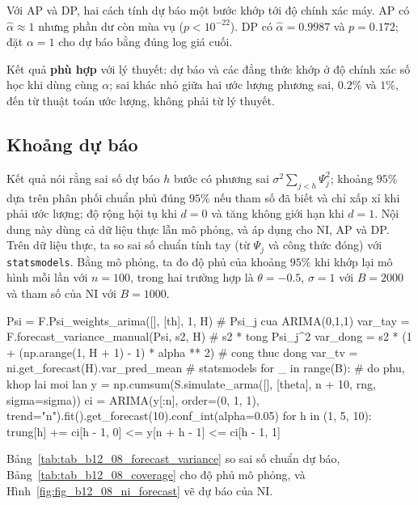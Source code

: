 Với AP và DP, hai cách tính dự báo một bước khớp tới độ chính xác máy. AP có $\hat\alpha\approx1$ nhưng phần dư còn mùa vụ ($p<10^{-22}$). DP có $\hat\alpha=0.9987$ và $p=0.172$; đặt $\alpha=1$ cho dự báo bằng đúng log giá cuối.

 Kết quả \textbf{phù hợp} với lý thuyết: dự báo và các đẳng thức khớp ở độ chính xác số học khi dùng cùng $\alpha$; sai khác nhỏ giữa hai ước lượng phương sai, $0.2\%$ và $1\%$, đến từ thuật toán ước lượng, không phải từ lý thuyết.

\subsection{Khoảng dự báo}

 Kết quả  nói rằng sai số dự báo $h$ bước có phương sai $\sigma^2\sum_{j<h}\Psi_j^2$; khoảng $95\%$ dựa trên phân phối chuẩn phủ đúng $95\%$ nếu tham số đã biết và chỉ xấp xỉ khi phải ước lượng; độ rộng hội tụ khi $d=0$ và tăng không giới hạn khi $d=1$.
 Nội dung này dùng cả dữ liệu thực lẫn mô phỏng, và áp dụng cho NI, AP và DP. Trên dữ liệu thực, ta so sai số chuẩn tính tay (từ $\Psi_j$ và công thức đóng) với \texttt{statsmodels}. Bằng mô phỏng, ta đo độ phủ của khoảng $95\%$ khi khớp lại mô hình mỗi lần với $n=100$, trong hai trường hợp là $\theta=-0.5$, $\sigma=1$ với $B=2000$ và tham số của NI với $B=1000$.
\begin{codeblock}
Psi = F.Psi_weights_arima([], [th], 1, H)                      # Psi_j cua ARIMA(0,1,1)
var_tay = F.forecast_variance_manual(Psi, s2, H)               # s2 * tong Psi_j^2
var_dong = s2 * (1 + (np.arange(1, H + 1) - 1) * alpha ** 2)   # cong thuc dong
var_tv = ni.get_forecast(H).var_pred_mean                      # statsmodels
for _ in range(B):                                             # do phu, khop lai moi lan
    y = np.cumsum(S.simulate_arma([], [theta], n + 10, rng, sigma=sigma))
    ci = ARIMA(y[:n], order=(0, 1, 1), trend="n").fit().get_forecast(10).conf_int(alpha=0.05)
    for h in (1, 5, 10): trung[h] += ci[h - 1, 0] <= y[n + h - 1] <= ci[h - 1, 1]
\end{codeblock}
 Bảng~\ref{tab:tab_b12_08_forecast_variance} so sai số chuẩn dự báo, Bảng~\ref{tab:tab_b12_08_coverage} cho độ phủ mô phỏng, và Hình~\ref{fig:fig_b12_08_ni_forecast} vẽ dự báo của NI.


